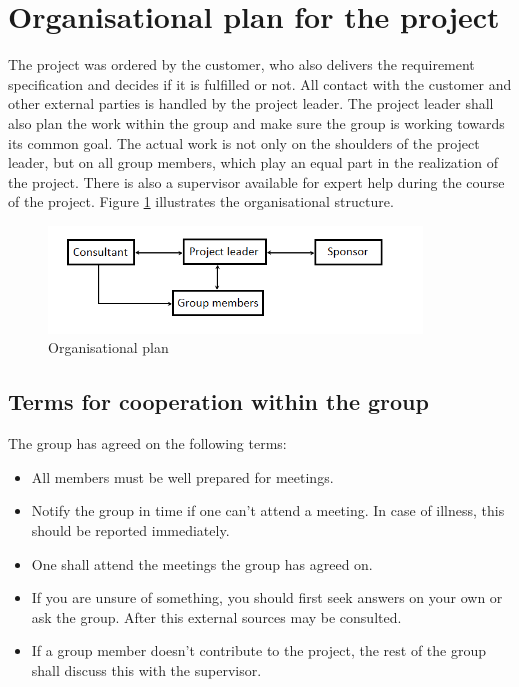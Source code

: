 \section{Organisational plan for the project}
The project was ordered by the customer, who also delivers the requirement specification and decides if it is fulfilled or not. All contact with the customer and other external parties is handled by the project leader. The project leader shall also plan the work within the group and make sure the group is working towards its common goal. The actual work is not only on the shoulders of the project leader, but on all group members, which play an equal part in the realization of the project. There is also a supervisor available for expert help during the course of the project. Figure \ref{organisationsplan} illustrates the organisational structure.

\begin{figure}[H]
  \begin{center}
    \includegraphics[keepaspectratio=true,width=375px]{grafik/organisationsplan.png}
    \caption{Organisational plan}
    \label{organisationsplan}
  \end{center}
\end{figure}

\subsection{Terms for cooperation within the group}
The group has agreed on the following terms:

\begin{itemize}
\item{All members must be well prepared for meetings.}
\item{Notify the group in time if one can't attend a meeting. In case of illness, this should be reported immediately.}
\item{One shall attend the meetings the group has agreed on.}
\item{If you are unsure of something, you should first seek answers on your own or ask the group. After this external sources may be consulted.}
\item{If a group member doesn't contribute to the project, the rest of the group shall discuss this with the supervisor.}
\end{itemize}

\newpage
